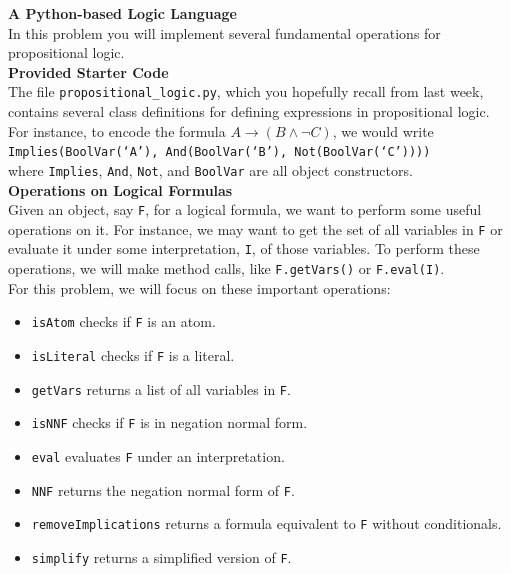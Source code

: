\documentclass[12pt]{article}
\newenvironment{problem}[2][Problem]{\begin{trivlist}
\item[\hskip \labelsep {\bfseries #1}\hskip \labelsep {\bfseries #2.}]}{\end{trivlist}}
\begin{document}
\begin{problem}{2} \textbf{A Python-based Logic Language} \\

In this problem you will implement several fundamental operations for propositional logic. \\

\textbf{Provided Starter Code} \\

The file \texttt{propositional\_logic.py}, which you hopefully recall from last week, contains several class definitions for defining expressions in propositional logic. For instance, to encode the formula 
$A \rightarrow (B \land \neg C)$, 
we would write \\

\texttt{Implies(BoolVar(`A'), And(BoolVar(`B'), Not(BoolVar(`C'))))} \\

where \texttt{Implies}, \texttt{And}, \texttt{Not}, and \texttt{BoolVar} are all object constructors. \\

\textbf{Operations on Logical Formulas} \\

Given an object, say \texttt{F}, for a logical formula, we want to perform some useful operations on it. For instance, we may want to get the set of all variables in \texttt{F} or evaluate it under some interpretation, \texttt{I}, of those variables. To perform these operations, we will make method calls, like \texttt{F.getVars()} or \texttt{F.eval(I)}. \\



For this problem, we will focus on these important operations: \\

\begin{itemize}
\item \texttt{isAtom} checks if \texttt{F} is an atom.
\item \texttt{isLiteral} checks if \texttt{F} is a literal.
\item \texttt{getVars} returns a list of all variables in \texttt{F}.
\item \texttt{isNNF} checks if \texttt{F} is in negation normal form.
\item \texttt{eval} evaluates \texttt{F} under an interpretation.
\item \texttt{NNF} returns the negation normal form of \texttt{F}.
\item \texttt{removeImplications} returns a formula equivalent to \texttt{F} without conditionals.
\item \texttt{simplify} returns a simplified version of \texttt{F}.
\end{itemize}


\end{problem}
\end{document}
